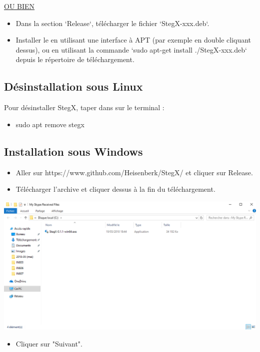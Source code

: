 \documentclass[11pt]{article}
\begin{document}
\underline{OU BIEN}

\begin{itemize}
\item Dans la section `Release`, télécharger le fichier `StegX-xxx.deb`.
\item Installer le en utilisant une interface à APT (par exemple en double cliquant
dessus), ou en utilisant la commande `sudo apt-get install ./StegX-xxx.deb`
depuis le répertoire de téléchargement.
\end{itemize}

\subsection{Désinstallation sous Linux}

Pour désinstaller StegX, taper dans sur le terminal : 
\begin{itemize}
\item sudo apt remove stegx
\end{itemize}

\subsection{Installation sous Windows}

\begin{itemize}
\item Aller sur https://www.github.com/Heisenberk/StegX/ et cliquer sur Release.
\item Télécharger l'archive et cliquer dessus à la fin du téléchargement.
\end{itemize}

\hspace{1cm}
\includegraphics[scale=0.5]{pictures/ouverture.png}
\vspace{1cm}

\newpage
\begin{itemize}
\item Cliquer sur "Suivant". 
\end{itemize}
\end{document}
